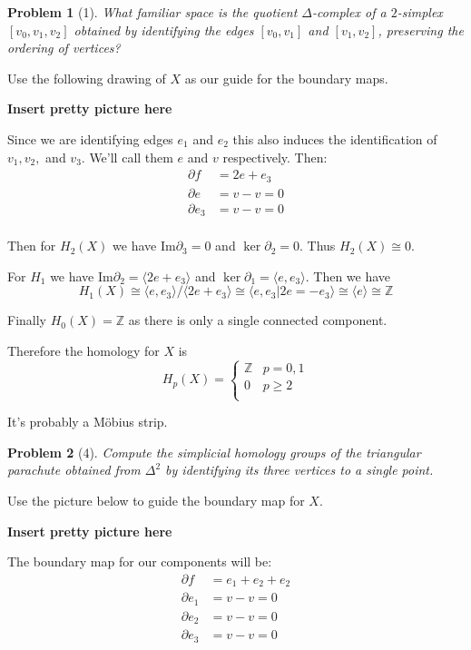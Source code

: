 \documentclass[10pt]{article}
\newcommand{\sk}{\vskip 10mm}
\newcommand{\bb}[1]{\mathbb{#1}}
\theoremstyle{plain}
\newtheorem{problem}{Problem}
\theoremstyle{remark}
\begin{document}
\begin{problem}[1]
  What familiar space is the quotient $\Delta$-complex of a $2$-simplex
  $[v_0,v_1,v_2]$ obtained by identifying the edges $[v_0,v_1]$ and
  $[v_1,v_2]$, preserving the ordering of vertices?
\end{problem}

Use the following drawing of $X$ as our guide for the boundary maps.

\textbf{Insert pretty picture here}

Since we are identifying edges $e_1$ and $e_2$ this also induces the
identification of $v_1,v_2,$ and $v_3$. We'll call them $e$
and $v$ respectively. Then:
\begin{align*}
  \partial f &= 2e+e_3\\
  \partial e &= v-v = 0\\
  \partial e_3 &= v-v = 0\\
\end{align*}

Then for $H_2(X)$ we have $\mathrm{Im}\partial_3=0$ and $\ker \partial_2 = 0$.
Thus $H_2(X)\cong 0$.

For $H_1$ we have $\mathrm{Im}\partial_2=\langle 2e+e_3\rangle$ and $\ker\partial_1=\langle e,e_3\rangle$.
Then we have
\[ H_1(X)\cong\langle e,e_3\rangle/\langle 2e+e_3\rangle\cong\langle e,e_3|2e=-e_3\rangle\cong\langle e\rangle\cong \bb{Z}\]

Finally $H_0(X)=\bb{Z}$ as there is only a single connected component.

Therefore the homology for $X$ is
\[
  H_p(X)=
  \left\{
    \begin{array}{ll}
      \bb{Z} & p=0,1\\
      0 & p\geq 2\\
    \end{array}
  \right.
\]

It's probably a M\"obius strip.

\sk

\begin{problem}[4]
  Compute the simplicial homology groups of the triangular parachute
  obtained from $\Delta^2$ by identifying its three vertices to a single point.
\end{problem}

Use the picture below to guide the boundary map for $X$.

\textbf{Insert pretty picture here}

The boundary map for our components will be:
\begin{align*}
  \partial f &= e_1+e_2+e_2\\
  \partial e_1 &= v-v=0\\
  \partial e_2 &= v-v=0\\
  \partial e_3 &= v-v=0\\
\end{align*}
\end{document}
